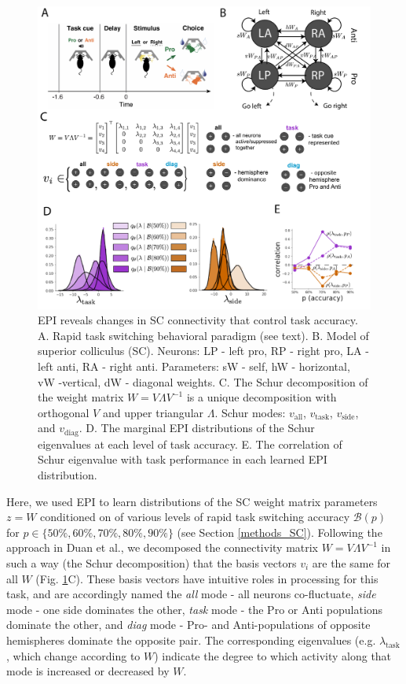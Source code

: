 \documentclass[11pt]{article}
\begin{document}
\begin{figure}
\begin{center}
\includegraphics[scale=0.5]{figures/fig4/fig4.pdf}
\end{center}
\caption{EPI reveals changes in SC \cite{duan2018collicular} connectivity that control task accuracy.  A. Rapid task switching behavioral paradigm (see text). B. Model of superior colliculus (SC). Neurons: LP - left pro, RP - right pro, LA - left anti, RA - right anti.  Parameters: sW - self, hW - horizontal, vW -vertical, dW - diagonal weights. C. The Schur decomposition of the weight matrix $W = V\Lambda V^{-1}$ is a unique decomposition with orthogonal $V$ and upper triangular $\Lambda$. Schur modes: $v_{\text{all}}$, $v_{\text{task}}$, $v_{\text{side}}$, and $v_{\text{diag}}$.  D. The marginal EPI distributions of the Schur eigenvalues at each level of task accuracy. E. The correlation of Schur eigenvalue with task performance in each learned EPI distribution.}
\label{fig:SC}
\end{figure}

Here, we used EPI to learn distributions of the SC weight matrix parameters $z = W$ conditioned on of various levels of rapid task switching accuracy $\mathcal{B}(p)$ for $p \in \{50\%, 60\%, 70\%, 80\%, 90\%\}$ (see Section \ref{methods_SC}).  Following the approach in Duan et al., we decomposed the connectivity matrix $W = V\Lambda V^{-1}$ in such a way (the Schur decomposition) that the basis vectors $v_i$ are the same for all $W$ (Fig. \ref{fig:SC}C). These basis vectors have intuitive roles in processing for this task, and are accordingly named the \textit{all} mode - all neurons co-fluctuate, \textit{side} mode - one side dominates the other, \textit{task} mode - the Pro or Anti populations dominate the other, and \textit{diag} mode - Pro- and Anti-populations of opposite hemispheres dominate the opposite pair. The corresponding eigenvalues (e.g. $\lambda_{\text{task}}$, which change according to $W$) indicate the degree to which activity along that mode is increased or decreased by $W$.  
\end{document}
